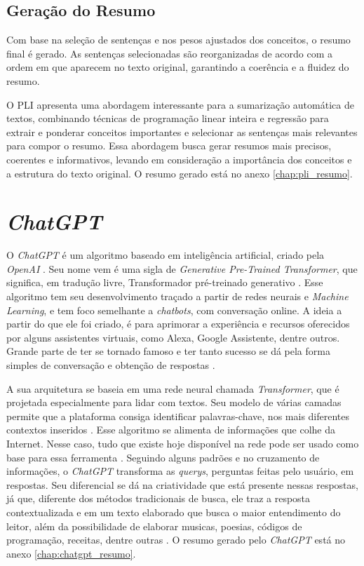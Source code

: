 \subsection{Geração do Resumo}
Com base na seleção de sentenças e nos pesos ajustados dos conceitos, o resumo final é gerado. As sentenças selecionadas são reorganizadas de acordo com a ordem em que aparecem no texto original, garantindo a coerência e a fluidez do resumo.

O PLI apresenta uma abordagem interessante para a sumarização automática de textos, combinando técnicas de programação linear inteira e regressão para extrair e ponderar conceitos importantes e selecionar as sentenças mais relevantes para compor o resumo. Essa abordagem busca gerar resumos mais precisos, coerentes e informativos, levando em consideração a importância dos conceitos e a estrutura do texto original.
O resumo gerado está no anexo \ref{chap:pli_resumo}.


\section{\textit{ChatGPT}}
\label{chap:chatgpt}

O \textit{ChatGPT} é um algoritmo baseado em inteligência artificial, criado pela \textit{OpenAI} \cite{lund2023chatting}. Seu nome vem é uma sigla de \textit{Generative Pre-Trained Transformer}, que significa, em tradução livre, Transformador pré-treinado generativo \cite{transformer2022rapamycin}. Esse algoritmo tem seu desenvolvimento traçado a partir de redes neurais e \textit{Machine Learning}, e tem foco semelhante a \textit{chatbots}, com conversação online. A ideia a partir do que ele foi criado, é para aprimorar a experiência e recursos oferecidos por alguns assistentes virtuais, como Alexa, Google Assistente, dentre outros. Grande parte de ter se tornado famoso e ter tanto sucesso se dá pela forma simples de conversação e obtenção de respostas \cite{aydin2023ChatGPT}.

A sua arquitetura se baseia em uma rede neural chamada \textit{Transformer}, que é projetada especialmente para lidar com textos. Seu modelo de várias camadas permite que a plataforma consiga identificar palavras-chave, nos mais diferentes contextos inseridos \cite{natarajan2020wide}. Esse algoritmo se alimenta de informações que colhe da Internet. Nesse caso, tudo que existe hoje disponível na rede pode ser usado como base para essa ferramenta \cite{rao2023assessing}. Seguindo alguns padrões e no cruzamento de informações, o \textit{ChatGPT} transforma as \textit{querys}, perguntas feitas pelo usuário, em respostas. Seu diferencial se dá na criatividade que está presente nessas respostas, já que, diferente dos métodos tradicionais de busca, ele traz a resposta contextualizada e em um texto elaborado que busca o maior entendimento do leitor, além da possibilidade de elaborar musicas, poesias, códigos de programação, receitas, dentre outras \cite{rudolph2023chatgpt}.
O resumo gerado pelo \textit{ChatGPT} está no anexo \ref{chap:chatgpt_resumo}.


